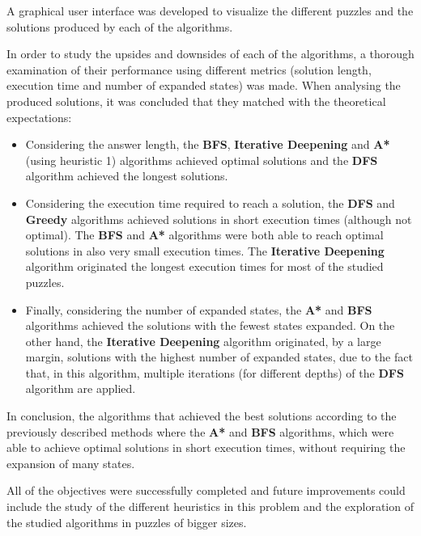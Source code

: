 \documentclass[conference]{IEEEtran}
\begin{document}
A graphical user interface was developed to visualize the different puzzles and the solutions produced by each of the algorithms.

In order to study the upsides and downsides of each of the algorithms, a thorough examination of their performance using different metrics (solution length, execution time and number of expanded states) was made. When analysing the produced solutions, it was concluded that they matched with the theoretical expectations:

\begin{itemize}
    \item Considering the answer length, the \textbf{BFS}, \textbf{Iterative Deepening} and \textbf{A*}(using heuristic 1) algorithms achieved optimal solutions and the \textbf{DFS} algorithm achieved the longest solutions.
    \item Considering the execution time required to reach a solution, the \textbf{DFS} and \textbf{Greedy} algorithms achieved solutions in short execution times (although not optimal). The \textbf{BFS} and \textbf{A*} algorithms were both able to reach optimal solutions in also very small execution times. The \textbf{Iterative Deepening} algorithm originated the longest execution times for most of the studied puzzles.
    \item Finally, considering the number of expanded states, the \textbf{A*} and \textbf{BFS} algorithms achieved the solutions with the fewest states expanded. On the other hand, the \textbf{Iterative Deepening} algorithm originated, by a large margin, solutions with the highest number of expanded states, due to the fact that, in this algorithm, multiple iterations (for different depths) of the \textbf{DFS} algorithm are applied.
\end{itemize}

In conclusion, the algorithms that achieved the best solutions according to the previously described methods where the \textbf{A*} and \textbf{BFS} algorithms, which were able to achieve optimal solutions in short execution times, without requiring the expansion of many states.

All of the objectives were successfully completed and future improvements could include the study of the different heuristics in this problem and the exploration of the studied algorithms in puzzles of bigger sizes.
\end{document}
